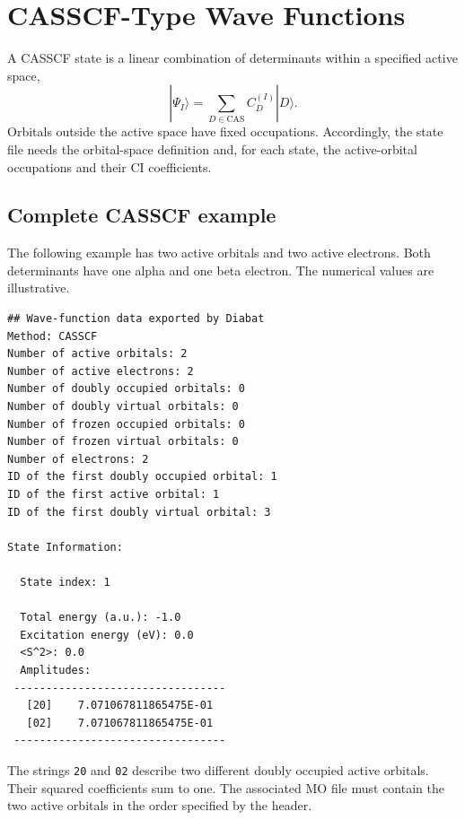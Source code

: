 \section{CASSCF-Type Wave Functions}\label{sec-diabat-wfn-casscf}
A CASSCF state is a linear combination of determinants within a specified active space,
\begin{equation}
|\Psi_I\rangle=\sum_{D\in\mathrm{CAS}}C_D^{(I)}|D\rangle.
\end{equation}
Orbitals outside the active space have fixed occupations. Accordingly, the state file needs the orbital-space definition and, for each state, the active-orbital occupations and their CI coefficients.

\subsection*{Complete CASSCF example}
The following example has two active orbitals and two active electrons. Both determinants have one alpha and one beta electron. The numerical values are illustrative.
\begin{lstlisting}[style=technicalfile]
## Wave-function data exported by Diabat
Method: CASSCF
Number of active orbitals: 2
Number of active electrons: 2
Number of doubly occupied orbitals: 0
Number of doubly virtual orbitals: 0
Number of frozen occupied orbitals: 0
Number of frozen virtual orbitals: 0
Number of electrons: 2
ID of the first doubly occupied orbital: 1
ID of the first active orbital: 1
ID of the first doubly virtual orbital: 3

State Information:

  State index: 1
  
  Total energy (a.u.): -1.0
  Excitation energy (eV): 0.0
  <S^2>: 0.0
  Amplitudes:
 ---------------------------------
   [20]    7.071067811865475E-01
   [02]    7.071067811865475E-01
 ---------------------------------
\end{lstlisting}
The strings \texttt{20} and \texttt{02} describe two different doubly occupied active orbitals. Their squared coefficients sum to one. The associated MO file must contain the two active orbitals in the order specified by the header.

